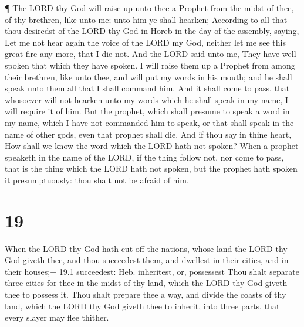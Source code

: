 ¶ The LORD thy God will raise up unto thee a Prophet from
the midst of thee, of thy brethren, like unto me; unto him ye shall
hearken;  According to all that thou desiredst of the LORD
thy God in Horeb in the day of the assembly, saying, Let me not hear
again the voice of the LORD my God, neither let me see this great fire
any more, that I die not.  And the LORD said unto me, They
have well spoken that which they have spoken.  I will raise
them up a Prophet from among their brethren, like unto thee, and will
put my words in his mouth; and he shall speak unto them all that I shall
command him.  And it shall come to pass, that whosoever
will not hearken unto my words which he shall speak in my name, I will
require it of him.  But the prophet, which shall presume to
speak a word in my name, which I have not commanded him to speak, or
that shall speak in the name of other gods, even that prophet shall die.
 And if thou say in thine heart, How shall we know the word
which the LORD hath not spoken?  When a prophet speaketh in
the name of the LORD, if the thing follow not, nor come to pass, that is
the thing which the LORD hath not spoken, but the prophet hath spoken it
presumptuously: thou shalt not be afraid of him.

\hypertarget{section-18}{%
\section{19}\label{section-18}}

 When the LORD thy God hath cut off the nations, whose land
the LORD thy God giveth thee, and thou succeedest them, and dwellest in
their cities, and in their houses;+ 19.1 succeedest: Heb. inheritest,
or, possessest  Thou shalt separate three cities for thee in
the midst of thy land, which the LORD thy God giveth thee to possess it.
 Thou shalt prepare thee a way, and divide the coasts of thy
land, which the LORD thy God giveth thee to inherit, into three parts,
that every slayer may flee thither.

